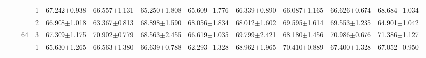 \begin{table}[htpb]
{\begin{tabular}{c|c|c|c|rr|rr|rr|rr}
                                 &                                                                                 &                                                                                        & 1                                                                                         & 67.242$\pm$0.938                        & 66.557$\pm$1.131                        & 65.250$\pm$1.808                        & 65.609$\pm$1.776                        & 66.339$\pm$0.890                        & 66.087$\pm$1.165                        & 66.626$\pm$0.674                        & 68.684$\pm$1.034                       \\
                                 &                                                                                 &                                                                                        & 2                                                                                         & 66.908$\pm$1.018                        & 63.367$\pm$0.813                        & 68.898$\pm$1.590                        & 68.056$\pm$1.834                        & 68.012$\pm$1.602                        & 69.595$\pm$1.614                        & 69.553$\pm$1.235                        & 64.901$\pm$1.042                       \\
                                 &                                                                                 & \multirow{-3}{*}{64}                                                                   & 3                                                                                         & 67.309$\pm$1.175                        & 70.902$\pm$0.779                        & 68.563$\pm$2.455                        & 66.619$\pm$1.035                        & 69.799$\pm$2.421                        & 68.180$\pm$1.456                        & 70.986$\pm$0.676                        & 71.386$\pm$1.127                       \\ \cline{3-12} 
                                 &                                                                                 &                                                                                        & 1                                                                                         & 65.630$\pm$1.265                        & 66.563$\pm$1.380                        & 66.639$\pm$0.788                        & 62.293$\pm$1.328                        & 68.962$\pm$1.965                        & 70.410$\pm$0.889                        & 67.400$\pm$1.328                        & 67.052$\pm$0.950                       \\

\end{tabular}}
\end{table}
